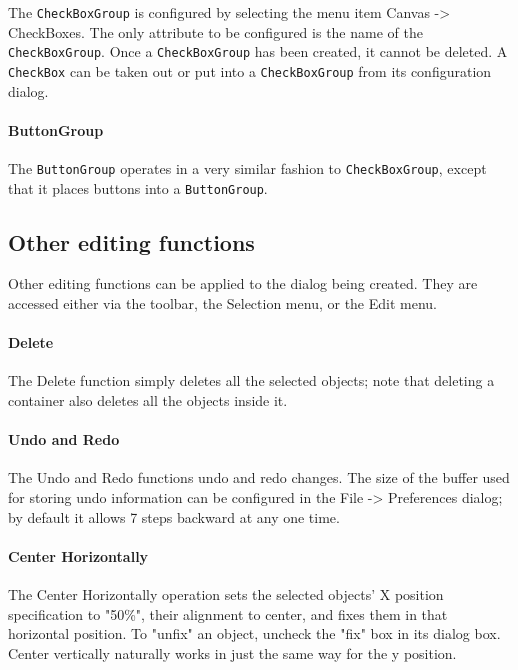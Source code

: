 The \texttt{CheckBoxGroup} is configured by selecting the menu
item Canvas -{\textgreater} CheckBoxes. The only attribute to
be configured is the name of the \texttt{CheckBoxGroup}. Once
a \texttt{CheckBoxGroup} has been created, it cannot be deleted. A
\texttt{CheckBox} can be taken out or put into a \texttt{CheckBoxGroup}
from its configuration dialog.

\paragraph{ButtonGroup}
The \texttt{ButtonGroup} operates in a very similar fashion to
\texttt{CheckBoxGroup}, except that it places buttons into a
\texttt{ButtonGroup}.



\subsection*{Other editing functions}

Other editing functions can be applied to
the dialog being created. They are accessed either via the toolbar,
the Selection menu, or the Edit menu.

\paragraph{Delete}
The Delete function simply deletes all the selected objects; note that
deleting a container also deletes all the objects inside it.

\paragraph{Undo and Redo}
The Undo and Redo functions undo and redo changes. The size of the
buffer used for storing undo information can be configured in the File
-{\textgreater} Preferences dialog; by default it allows 7 steps
backward at any one time.

\paragraph[Center Horizontally]{Center Horizontally}
The Center Horizontally operation sets the selected
objects' X position specification to
"50\%", their alignment to center, and
fixes them in that horizontal position. To
"unfix" an object, uncheck the
"fix" box in its dialog box. Center
vertically naturally works in just the same way for the y position.

